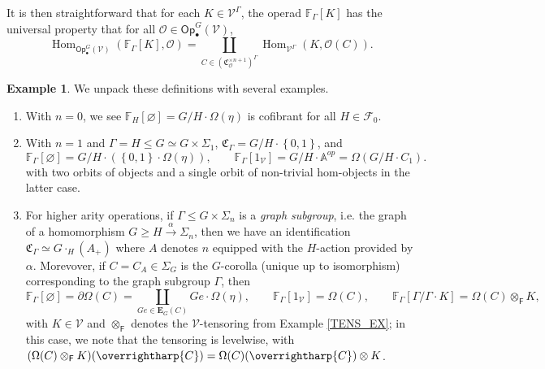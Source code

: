 \documentclass[a4paper,10pt
,draft
]{article}%
\numberwithin{equation}{section}
\numberwithin{figure}{section}
\theoremstyle{definition} %
\newtheorem{example}[equation]{Example}%
\newcommand{\set}[1]{\left\{#1\right\}}%
\newcommand{\vect}[1]{\text{\overrightharp{\ensuremath{#1}}}}
\newcommand{\Fin}{\mathsf{F}}%
\newcommand{\sSet}{\ensuremath{\mathsf{sSet}}}%
\newcommand{\Op}{\mathsf{Op}}%
\DeclareMathOperator{\Hom}{Hom}%
\newcommand{\V}{\ensuremath{\mathcal V}}
\renewcommand{\O}{\ensuremath{\mathcal O}}
\newcommand{\1}{\ensuremath{\mathbbm 1}}%
\begin{document}






It is then straightforward that for each $K \in \V^\Gamma$,
the operad $\mathbb F_\Gamma[K]$ has the universal property that for all $\O \in \Op^G_\bullet(\V)$,
\begin{equation}
      \Hom_{\Op^G_\bullet(\V)}(\mathbb F_\Gamma[K], \O) = \mathop\coprod\limits_{C \in (\mathfrak C_{\O}^{\times n+1})^\Gamma}\Hom_{\V^\Gamma}(K, \O(C)).
\end{equation}




\begin{example}
      \label{FREEOP_EX}
      We unpack these definitions with several examples.
      \begin{enumerate}[label = (\roman*)]
      \item With $n = 0$, we see $\mathbb F_H[\varnothing] = G/H \cdot \Omega(\eta)$ is cofibrant for all $H \in \mathcal F_0$.
      \item With $n = 1$ and $\Gamma = H \leq G \simeq G \times \Sigma_1$, $\mathfrak C_\Gamma = G/H \cdot \set{0,1}$, and
            \[
                  \mathbb F_{\Gamma}[\varnothing] = G/H \cdot (\set{0,1} \cdot \Omega(\eta)),
                  \qquad
                  \mathbb F_{\Gamma}[1_\V] = G/H \cdot \mathbb A^{op} = \Omega(G/H \cdot C_1).
            \]
            with two orbits of objects and a single orbit of non-trivial hom-objects in the latter case.
      \item For higher arity operations,
            if $\Gamma \leq G \times \Sigma_n$ is a \textit{graph subgroup}, i.e. the graph of a homomorphism $G \geq H \xrightarrow{\alpha} \Sigma_n$, then
            we have an identification $\mathfrak C_{\Gamma} \simeq G \cdot_H (A_+)$ where $A$ denotes $n$ equipped with the $H$-action provided by $\alpha$.
            Morevover, if $C = C_A \in \Sigma_G$ is the $G$-corolla (unique up to isomorphism) corresponding to the graph subgroup $\Gamma$, then
            \[
                  \mathbb F_\Gamma[\varnothing] = \partial\Omega(C) = \coprod_{Ge \in \boldsymbol{E}_G(C)} Ge \cdot \Omega(\eta),
                  \qquad
                  \mathbb F_{\Gamma}[1_\V] = \Omega(C),
                  \qquad
                  \mathbb F_\Gamma[\Gamma/\Gamma \cdot K] = \Omega(C) \otimes_\Fin K,
            \]
            with $K \in \V$ and $\otimes_\Fin$ denotes the $\V$-tensoring from Example \ref{TENS_EX};
            in this case, we note that the tensoring is levelwise, with
            $(\Omega(C) \otimes_\Fin K)(\vect C) = \Omega(C)(\vect C) \otimes K$.            
            

\end{enumerate}
\end{example}
\end{document}
